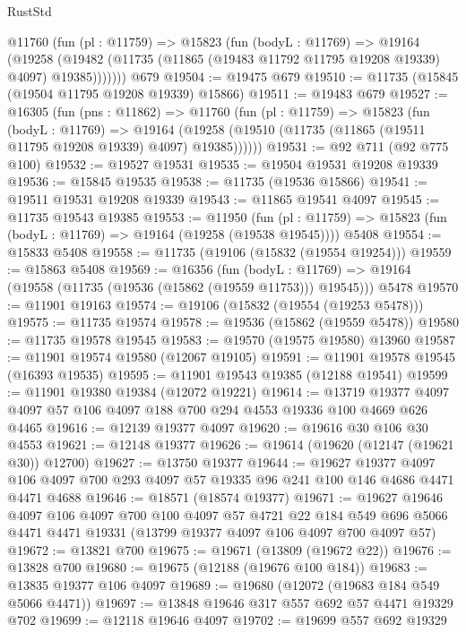 \begin{lexlean}{RustStd}
\begin{coremodule}
      @11760
        (fun (pl : @11759) =>
        @15823
          (fun (bodyL : @11769) =>
          @19164
            (@19258
              (@19482 (@11735 (@11865 (@19483 @11792 @11795 @19208 @19339) @4097) @19385)))))))
    @679
@19504 := @19475 @679
@19510 := @11735 (@15845 (@19504 @11795 @19208 @19339) @15866)
@19511 := @19483 @679
@19527 := @16305
    (fun (pns : @11862) =>
    @11760
      (fun (pl : @11759) =>
      @15823
        (fun (bodyL : @11769) =>
        @19164 (@19258 (@19510 (@11735 (@11865 (@19511 @11795 @19208 @19339) @4097) @19385))))))
@19531 := @92 @711 (@92 @775 @100)
@19532 := @19527 @19531
@19535 := @19504 @19531 @19208 @19339
@19536 := @15845 @19535
@19538 := @11735 (@19536 @15866)
@19541 := @19511 @19531 @19208 @19339
@19543 := @11865 @19541 @4097
@19545 := @11735 @19543 @19385
@19553 := @11950
    (fun (pl : @11759) => @15823 (fun (bodyL : @11769) => @19164 (@19258 (@19538 @19545))))
    @5408
@19554 := @15833 @5408
@19558 := @11735 (@19106 (@15832 (@19554 @19254)))
@19559 := @15863 @5408
@19569 := @16356
    (fun (bodyL : @11769) => @19164 (@19558 (@11735 (@19536 (@15862 (@19559 @11753))) @19545)))
    @5478
@19570 := @11901 @19163
@19574 := @19106 (@15832 (@19554 (@19253 @5478)))
@19575 := @11735 @19574
@19578 := @19536 (@15862 (@19559 @5478))
@19580 := @11735 @19578 @19545
@19583 := @19570 (@19575 @19580) @13960
@19587 := @11901 @19574 @19580 (@12067 @19105)
@19591 := @11901 @19578 @19545 (@16393 @19535)
@19595 := @11901 @19543 @19385 (@12188 @19541)
@19599 := @11901 @19380 @19384 (@12072 @19221)
@19614 := @13719 @19377 @4097 @4097 @57 @106 @4097 @188 @700 @294 @4553 @19336 @100 @4669 @626 @4465
@19616 := @12139 @19377 @4097
@19620 := @19616 @30 @106 @30 @4553
@19621 := @12148 @19377
@19626 := @19614 (@19620 (@12147 (@19621 @30)) @12700)
@19627 := @13750 @19377
@19644 := @19627
    @19377
    @4097
    @106
    @4097
    @700
    @293
    @4097
    @57
    @19335
    @96
    @241
    @100
    @146
    @4686
    @4471
    @4471
    @4688
@19646 := @18571 (@18574 @19377)
@19671 := @19627
    @19646
    @4097
    @106
    @4097
    @700
    @100
    @4097
    @57
    @4721
    @22
    @184
    @549
    @696
    @5066
    @4471
    @4471
    @19331
    (@13799 @19377 @4097 @106 @4097 @700 @4097 @57)
@19672 := @13821 @700
@19675 := @19671 (@13809 (@19672 @22))
@19676 := @13828 @700
@19680 := @19675 (@12188 (@19676 @100 @184))
@19683 := @13835 @19377 @106 @4097
@19689 := @19680 (@12072 (@19683 @184 @549 @5066 @4471))
@19697 := @13848 @19646 @317 @557 @692 @57 @4471 @19329 @702
@19699 := @12118 @19646 @4097
@19702 := @19699 @557 @692 @19329

\end{coremodule}
\end{lexlean}
